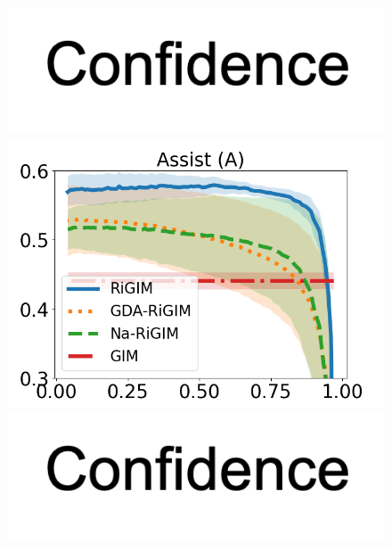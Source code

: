 \documentclass{article}
\begin{document}
\begin{figure}[htbp]
\begin{minipage}{0.16\textwidth}
    \vspace{-0.05in}
    \includegraphics[scale=0.12]{figures/confidence_x_label.png}
    \end{minipage}
    \begin{minipage}{0.16\textwidth}
    \centering
    \includegraphics[scale=0.14]{figures/soccer_risk_curve_Assists_shadow.png}\par
    \vspace{-0.05in}
    \includegraphics[scale=0.12]{figures/confidence_x_label.png}
    \end{minipage}
    \begin{minipage}{0.16\textwidth}
    \centering

\end{minipage}
\end{figure}
\end{document}
